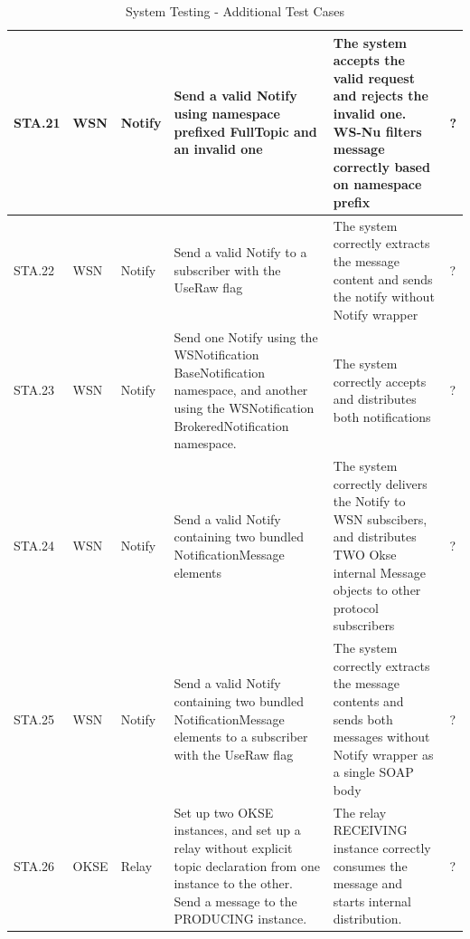 \begin{table}[ht!]
\begin{tabular}{|m{0.5cm}|m{1.2cm}|m{1.2cm}|m{3.3cm}|m{3.3cm}|m{1.5cm}|}
STA.21 & WSN & Notify & Send a valid Notify using namespace prefixed FullTopic and an invalid one & The system accepts the valid request and rejects the invalid one. WS-Nu filters message correctly based on namespace prefix & ? \\ \hline
STA.22 & WSN & Notify & Send a valid Notify to a subscriber with the UseRaw flag & The system correctly extracts the message content and sends the notify without Notify wrapper & ? \\ \hline
STA.23 & WSN & Notify & Send one Notify using the WSNotification BaseNotification namespace, and another using the WSNotification BrokeredNotification namespace. & The system correctly accepts and distributes both notifications & ? \\ \hline
STA.24 & WSN & Notify & Send a valid Notify containing two bundled NotificationMessage elements & The system correctly delivers the Notify to WSN subscibers, and distributes TWO Okse internal Message objects to other protocol subscribers & ? \\ \hline
STA.25 & WSN & Notify & Send a valid Notify containing two bundled NotificationMessage elements to a subscriber with the UseRaw flag & The system correctly extracts the message contents and sends both messages without Notify wrapper as a single SOAP body & ? \\ \hline
STA.26 & OKSE & Relay & Set up two OKSE instances, and set up a relay without explicit topic declaration from one instance to the other. Send a message to the PRODUCING instance. & The relay RECEIVING instance correctly consumes the message and starts internal distribution. & ? \\ \hline
\end{tabular}
\caption{System Testing - Additional Test Cases}
\label{table:system_testing-additional_test_cases}
\end{table}

